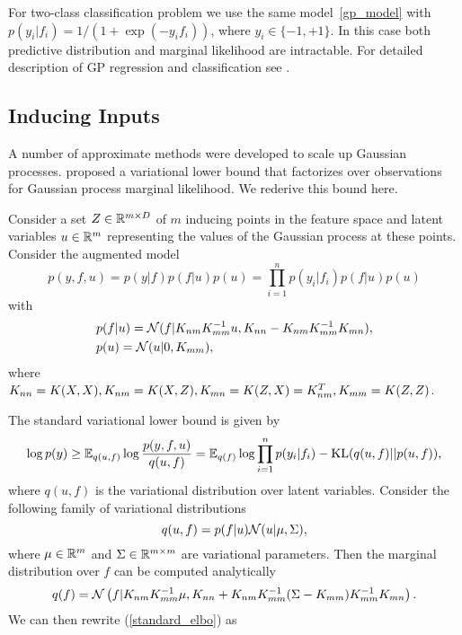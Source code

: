   For two-class classification problem we use the same model~\eqref{gp_model} with $p(y_i | f_i)=1/(1+\exp(-y_if_i))$, where $y_i\in\{-1,+1\}$. In this case both predictive distribution and marginal likelihood are intractable. For detailed description of GP regression and classification see \citet{rasmussen2006}.

\subsection{Inducing Inputs}
\label{inducing_inputs}

  A number of approximate methods were developed to scale up Gaussian processes.
  \citet{hensman2013} proposed a variational lower bound that factorizes over
  observations for Gaussian process marginal likelihood. We rederive
  this bound here.

  Consider a set $Z \in \mathbb{R}^{m \times D}$ of $m$ inducing points in the feature space and latent variables $u \in \mathbb{R}^m$ representing the values of
  the Gaussian process at these points. Consider the augmented model
  \[
    p(y, f, u) = p(y | f) p(f | u) p(u) = \prod_{i = 1}^ n p(y_i | f_i) p(f | u) p(u)
  \]
  with 
  \begin{align}
    &p(f | u) = \mathcal{N}(f | K_{nm} K_{mm}^{-1} u, K_{nn} - K_{nm} K_{mm}^{-1} K_{mn}),\label{priors}\\
    &p(u)= \mathcal{N}(u | 0, K_{mm}),\notag
  \end{align}
  where $K_{nn} = K(X, X), K_{nm} = K(X, Z), K_{mn} = K(Z, X) = K_{nm}^T, K_{mm} = K(Z, Z)$.

  The standard variational lower bound is given by
  \begin{equation}
  \label{standard_elbo}
    \log p(y) \ge \mathbb{E}_{q(u, f)} \log \frac {p(y, f, u)} {q(u, f)} =
    \mathbb{E}_{q(f)} \log \prod_{i=1}^n p(y_i | f_i) - \mbox{KL}(q(u, f) || p(u, f)),
  \end{equation}
  where $q(u, f)$ is the variational distribution over latent variables.
  Consider the following family of variational distributions
  \begin{equation}
  \label{var_family}
    q(u, f) = p(f | u) \mathcal{N}(u | \mu, \Sigma),
  \end{equation}
  where $\mu \in \mathbb{R}^m$ and $\Sigma \in \mathbb{R}^{m \times m}$ are variational
  parameters. Then the marginal distribution over $f$ can be computed analytically
  \[
    q(f) = \mathcal{N}\left(f | K_{nm} K_{mm}^{-1} \mu, K_{nn} + K_{nm} K_{mm}^{-1} (\Sigma - K_{mm}) K_{mm}^{-1} K_{mn}\right).
  \]
  We can then rewrite (\ref{standard_elbo}) as

